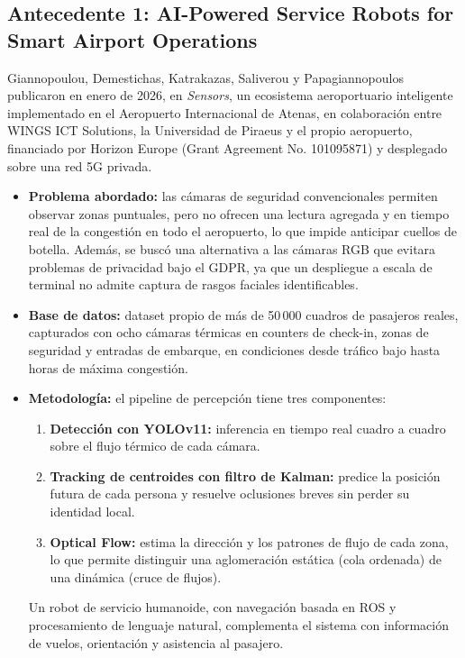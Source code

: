 \documentclass[12pt,a4paper]{article}
\begin{document}
\subsection{\texorpdfstring{Antecedente 1: AI-Powered Service Robots for Smart Airport Operations~\cite{giannopoulou2026}}{Antecedente 1: AI-Powered Service Robots for Smart Airport Operations}}

Giannopoulou, Demestichas, Katrakazas, Saliverou y Papagiannopoulos
publicaron en enero de 2026, en \textit{Sensors}, un ecosistema
aeroportuario inteligente implementado en el Aeropuerto Internacional de
Atenas, en colaboración entre WINGS ICT Solutions, la Universidad de
Piraeus y el propio aeropuerto, financiado por Horizon Europe (Grant
Agreement No. 101095871) y desplegado sobre una red 5G privada.

\begin{itemize}
    \item \textbf{Problema abordado:} las cámaras de seguridad
    convencionales permiten observar zonas puntuales, pero no ofrecen una
    lectura agregada y en tiempo real de la congestión en todo el
    aeropuerto, lo que impide anticipar cuellos de botella. Además, se
    buscó una alternativa a las cámaras RGB que evitara problemas de
    privacidad bajo el GDPR, ya que un despliegue a escala de terminal no
    admite captura de rasgos faciales identificables.

    \item \textbf{Base de datos:} dataset propio de más de 50\,000
    cuadros de pasajeros reales, capturados con ocho cámaras térmicas en
    counters de check-in, zonas de seguridad y entradas de embarque, en
    condiciones desde tráfico bajo hasta horas de máxima congestión.

    \item \textbf{Metodología:} el pipeline de percepción tiene tres
    componentes:
    \begin{enumerate}
        \item \textbf{Detección con YOLOv11:} inferencia en tiempo real
        cuadro a cuadro sobre el flujo térmico de cada cámara.
        \item \textbf{Tracking de centroides con filtro de Kalman:}
        predice la posición futura de cada persona y resuelve oclusiones
        breves sin perder su identidad local.
        \item \textbf{Optical Flow:} estima la dirección y los patrones de
        flujo de cada zona, lo que permite distinguir una aglomeración
        estática (cola ordenada) de una dinámica (cruce de flujos).
    \end{enumerate}
    Un robot de servicio humanoide, con navegación basada en ROS y
    procesamiento de lenguaje natural, complementa el sistema con
    información de vuelos, orientación y asistencia al pasajero.


\end{itemize}
\end{document}

